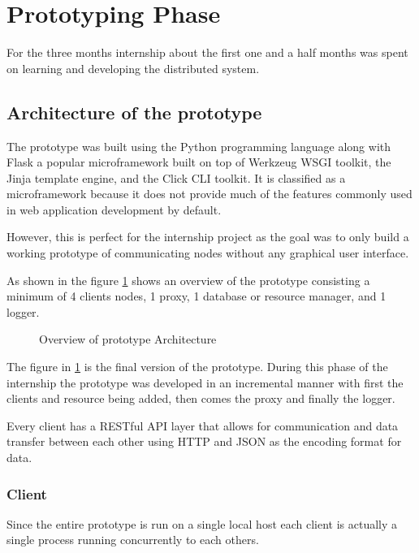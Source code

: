 \section{Prototyping Phase}

For the three months internship about the first one and a half months was spent 
on learning and developing the distributed system.

\subsection{Architecture of the prototype}

The prototype was built using the Python programming language along 
with Flask \cite{flask} a popular microframework built on top of Werkzeug WSGI 
toolkit, the Jinja template engine, and the Click CLI toolkit. It is classified
as a microframework because it does not provide much of the features commonly used
in web application development by default. 

However, this is perfect for the internship project as the goal was to only build
a working prototype of communicating nodes without any graphical user interface.

As shown in the figure \ref{fig:prototype_architecture} shows an overview of the prototype 
consisting a minimum of 4 clients nodes, 1 proxy, 1 database or resource manager, and 1 logger.

\begin{figure}[htbp]
  \centering
   
  \caption{Overview of prototype Architecture}
  \label{fig:prototype_architecture}
\end{figure}

The figure in \ref{fig:prototype_architecture} is the final version of the prototype.
During this phase of the internship the prototype was developed in an incremental
manner with first the clients and resource being added, then comes the proxy and 
finally the logger.

Every client has a RESTful API layer that allows for communication and data transfer 
between each other using HTTP and JSON as the encoding format for data.

\subsubsection{Client}

Since the entire prototype is run on a single local host each client is actually 
a single process running concurrently to each others. 


